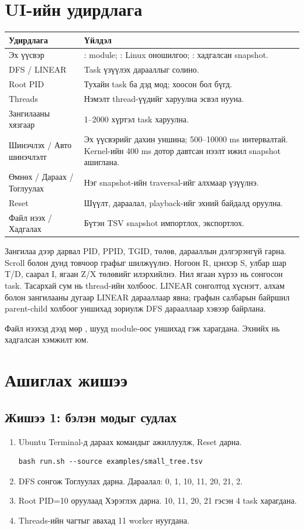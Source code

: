 \clearpage
\section{UI-ийн удирдлага}
\begin{table}[H]
\centering\small
\begin{tabularx}{\textwidth}{@{}P{3.7cm}Y@{}}\toprule
Удирдлага & Үйлдэл \\\midrule
Эх үүсвэр & : module; : Linux оношилгоо; : хадгалсан snapshot. \\
DFS / LINEAR & Task үзүүлэх дарааллыг солино. \\
Root PID & Тухайн task ба дэд мод; хоосон бол бүгд. \\
Threads & Нэмэлт thread-үүдийг харуулна эсвэл нууна. \\
Зангилааны хязгаар & 1--2000 хүртэл task харуулна. \\
Шинэчлэх / Авто шинэчлэлт & Эх үүсвэрийг дахин уншина; 500--10000 ms интервалтай. Kernel-ийн 400 ms дотор давтсан нээлт ижил snapshot ашиглана. \\
Өмнөх / Дараах / Тоглуулах & Нэг snapshot-ийн traversal-ийг алхмаар үзүүлнэ. \\
Reset & Шүүлт, дараалал, playback-ийг эхний байдалд оруулна. \\
Файл нээх / Хадгалах & Бүтэн TSV snapshot импортлох, экспортлох. \\\bottomrule
\end{tabularx}
\end{table}
Зангилаа дээр дарвал PID, PPID, TGID, төлөв, дарааллын дэлгэрэнгүй гарна. Scroll болон дунд товчоор графыг шилжүүлнэ. Ногоон R, цэнхэр S, улбар шар T/D, саарал I, ягаан Z/X төлөвийг илэрхийлнэ. Нил ягаан хүрээ нь сонгосон task. Тасархай сум нь thread-ийн холбоос. LINEAR сонголтод хүснэгт, алхам болон зангилааны дугаар LINEAR дарааллаар явна; графын салбарын байршил parent-child холбоог уншихад зориулж DFS дарааллаар хэвээр байрлана.

Файл нээхэд дээд мөр , шууд module-оос уншихад
 гэж харагдана. Эхнийх нь хадгалсан хэмжилт юм.

\section{Ашиглах жишээ}
\subsection{Жишээ 1: бэлэн модыг судлах}
\begin{enumerate}
\item Ubuntu Terminal-д дараах командыг ажиллуулж, Reset дарна.
\begin{lstlisting}
bash run.sh --source examples/small_tree.tsv
\end{lstlisting}
\item DFS сонгож Тоглуулах дарна. Дараалал: 0, 1, 10, 11, 20, 21, 2.
\item Root PID=10 оруулаад Хэрэглэх дарна. 10, 11, 20, 21 гэсэн 4 task харагдана.
\item Threads-ийн чагтыг авахад 11 worker нуугдана.
\end{enumerate}
